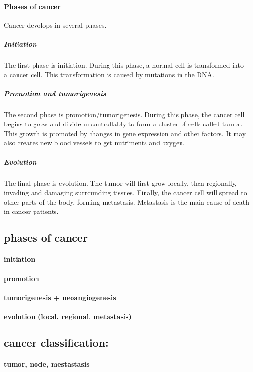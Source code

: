 \paragraph{Phases of cancer}
Cancer devolops in several phases.
\subparagraph{Initiation}
The first phase is initiation.
During this phase, a normal cell is transformed into a cancer cell.
This transformation is caused by mutations in the DNA.
\subparagraph{Promotion and tumorigenesis}
The second phase is promotion/tumorigenesis.
During this phase, the cancer cell begins to grow and divide uncontrollably to form a cluster of cells called tumor.
This growth is promoted by changes in gene expression and other factors.
It may also creates new blood vessels to get nutriments and oxygen.
\subparagraph{Evolution}
The final phase is evolution.
The tumor will first grow locally, then regionally, invading and damaging surrounding tissues.
Finally, the cancer cell will spread to other parts of the body, forming metastasis.
Metastasis is the main cause of death in cancer patients.


\subsection{phases of cancer}
\paragraph{initiation}
\paragraph{promotion}
\paragraph{tumorigenesis + neoangiogenesis}
\paragraph{evolution (local, regional, metastasis)}

\subsection{cancer classification:}
\paragraph{tumor, node, mestastasis}
